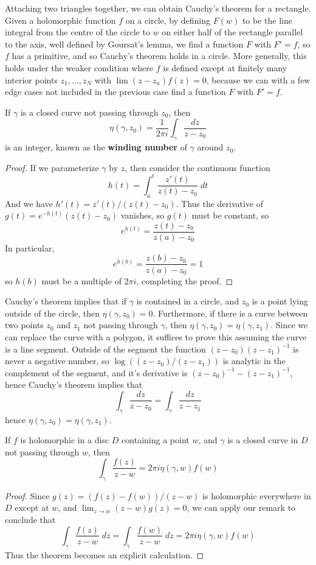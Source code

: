 Attaching two triangles together, we can obtain Cauchy's theorem for a rectangle. Given a holomorphic function $f$ on a circle, by defining $F(w)$ to be the line integral from the centre of the circle to $w$ on either half of the rectangle parallel to the axis, well defined by Goursat's lemma, we find a function $F$ with $F' = f$, so $f$ has a primitive, and so Cauchy's theorem holds in a circle. More generally, this holds under the weaker condition where $f$ is defined except at finitely many interior points $z_1, \dots, z_N$ with $\lim (z - z_n) f(z) = 0$, because we can with a few edge cases not included in the previous case find a function $F$ with $F' = f$.

\begin{lemma}
    If $\gamma$ is a closed curve not passing through $z_0$, then
    \[ \eta(\gamma,z_0) = \frac{1}{2 \pi i} \int_\gamma \frac{dz}{z - z_0} \]
    is an integer, known as the {\bf winding number} of $\gamma$ around $z_0$.
\end{lemma}
\begin{proof}
    If we parameterize $\gamma$ by $z$, then consider the continuous function
    \[ h(t) = \int_a^t \frac{z'(t)}{z(t) - z_0}\; dt \]
    And we have $h'(t) = z'(t)/(z(t) - z_0)$. Thus the derivative of $g(t) = e^{-h(t)}(z(t) - z_0)$ vanishes, so $g(t)$ must be constant, so
    \[ e^{h(t)} = \frac{z(t) - z_0}{z(a) - z_0} \]
    In particular,
    \[ e^{h(b)} = \frac{z(b) - z_0}{z(a) - z_0} = 1 \]
    so $h(b)$ must be a multiple of $2 \pi i$, completing the proof.
\end{proof}

Cauchy's theorem implies that if $\gamma$ is contained in a circle, and $z_0$ is a point lying outside of the circle, then $\eta(\gamma,z_0) = 0$. Furthermore, if there is a curve between two points $z_0$ and $z_1$ not passing through $\gamma$, then $\eta(\gamma,z_0) = \eta(\gamma,z_1)$. Since we can replace the curve with a polygon, it suffices to prove this assuming the curve is a line segment. Outside of the segment the function $(z - z_0)(z - z_1)^{-1}$ is never a negative number, so $\log((z-z_0)/(z-z_1))$ is analytic in the complement of the segment, and it's derivative is $(z - z_0)^{-1} - (z - z_1)^{-1}$, hence Cauchy's theorem implies that
%
\[ \int_\gamma \frac{dz}{z - z_0} = \int_\gamma \frac{dz}{z - z_1} \]
%
hence $\eta(\gamma,z_0) = \eta(\gamma,z_1)$.

\begin{theorem}
    If $f$ is holomorphic in a disc $D$ containing a point $w$, and $\gamma$ is a closed curve in $D$ not passing through $w$, then
    \[ \int_\gamma \frac{f(z)}{z - w} = 2 \pi i \eta(\gamma,w) f(w) \]
\end{theorem}
\begin{proof}
    Since $g(z) = (f(z) - f(w))/(z-w)$ is holomorphic everywhere in $D$ except at $w$, and $\lim_{z \to w} (z - w) g(z) = 0$, we can apply our remark to conclude that
    \[ \int_\gamma \frac{f(z)}{z - w}\; dz = \int_\gamma \frac{f(w)}{z - w}\; dz = 2 \pi i \eta(\gamma,w) f(w) \]
    Thus the theorem becomes an explicit calculation.
\end{proof}


